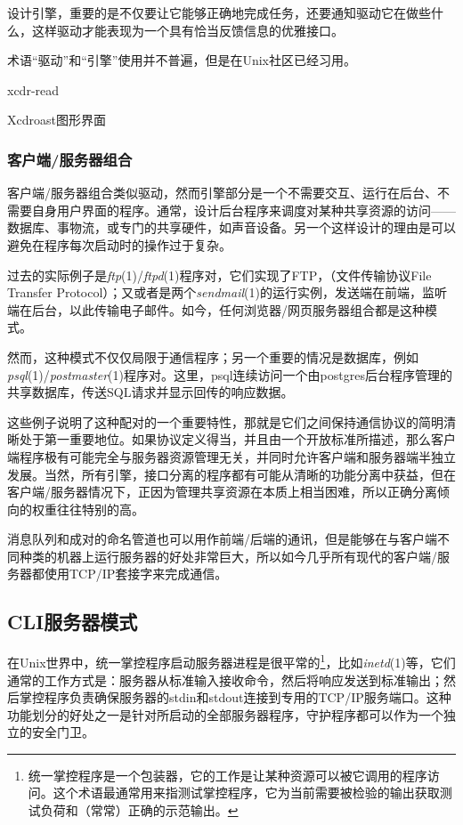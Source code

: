 \documentclass[12pt,oneside]{book}
\begin{document}
\begin{common-format}
设计引擎，重要的是不仅要让它能够正确地完成任务，还要通知驱动它在做些什么，这样驱动才能表现为一个具有恰当反馈信息的优雅接口。

术语“驱动”和“引擎”使用并不普遍，但是在Unix社区已经习用。

\begin{fig}{xcdr-read}
\caption{Xcdroast图形界面}
\label{fig:xcdr-read}
\end{fig}

\subsubsection{客户端/服务器组合}
客户端/服务器组合类似驱动，然而引擎部分是一个不需要交互、运行在后台、不需要自身用户界面的程序。通常，设计后台程序来调度对某种共享资源的访问——数据库、事物流，或专门的共享硬件，如声音设备。另一个这样设计的理由是可以避免在程序每次启动时的操作过于复杂。

过去的实际例子是\textit{ftp}(1)/\textit{ftpd}(1)程序对，它们实现了FTP，（文件传输协议File Transfer Protocol）；又或者是两个\textit{sendmail}(1)的运行实例，发送端在前端，监听端在后台，以此传输电子邮件。如今，任何浏览器/网页服务器组合都是这种模式。

然而，这种模式不仅仅局限于通信程序；另一个重要的情况是数据库，例如\textit{psql}(1)/\textit{postmaster}(1)程序对。这里，psql连续访问一个由postgres后台程序管理的共享数据库，传送SQL请求并显示回传的响应数据。

这些例子说明了这种配对的一个重要特性，那就是它们之间保持通信协议的简明清晰处于第一重要地位。如果协议定义得当，并且由一个开放标准所描述，那么客户端程序极有可能完全与服务器资源管理无关，并同时允许客户端和服务器端半独立发展。当然，所有引擎，接口分离的程序都有可能从清晰的功能分离中获益，但在客户端/服务器情况下，正因为管理共享资源在本质上相当困难，所以正确分离倾向的权重往往特别的高。

消息队列和成对的命名管道也可以用作前端/后端的通讯，但是能够在与客户端不同种类的机器上运行服务器的好处非常巨大，所以如今几乎所有现代的客户端/服务器都使用TCP/IP套接字来完成通信。

\subsection{CLI服务器模式}
在Unix世界中，统一掌控程序启动服务器进程是很平常的\footnote{统一掌控程序是一个包装器，它的工作是让某种资源可以被它调用的程序访问。这个术语最通常用来指测试掌控程序，它为当前需要被检验的输出获取测试负荷和（常常）正确的示范输出。}，比如\textit{inetd}(1)等，它们通常的工作方式是：服务器从标准输入接收命令，然后将响应发送到标准输出；然后掌控程序负责确保服务器的stdin和stdout连接到专用的TCP/IP服务端口。这种功能划分的好处之一是针对所启动的全部服务器程序，守护程序都可以作为一个独立的安全门卫。


\end{common-format}
\end{document}

